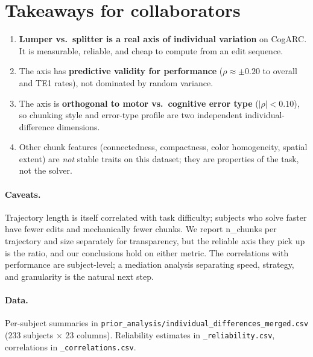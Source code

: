 \documentclass[11pt]{article}
\begin{document}
\section*{Takeaways for collaborators}

\begin{enumerate}
  \item \textbf{Lumper vs.\ splitter is a real axis of individual
    variation} on CogARC. It is measurable, reliable, and cheap to
    compute from an edit sequence.
  \item The axis has \textbf{predictive validity for performance} ($\rho
    \approx \pm 0.20$ to overall and TE1 rates), not dominated by
    random variance.
  \item The axis is \textbf{orthogonal to motor vs.~cognitive error
    type} ($|\rho| < 0.10$), so chunking style and error-type profile
    are two independent individual-difference dimensions.
  \item Other chunk features (connectedness, compactness, color
    homogeneity, spatial extent) are \emph{not} stable traits on this
    dataset; they are properties of the task, not the solver.
\end{enumerate}

\paragraph{Caveats.} Trajectory length is itself correlated with task
difficulty; subjects who solve faster have fewer edits and mechanically
fewer chunks. We report n\_chunks per trajectory and size separately
for transparency, but the reliable axis they pick up is the ratio,
and our conclusions hold on either metric. The correlations
with performance are subject-level; a mediation analysis separating
speed, strategy, and granularity is the natural next step.

\paragraph{Data.} Per-subject summaries in
\texttt{prior\_analysis/individual\_differences\_merged.csv} (233
subjects × 23 columns). Reliability estimates in
\texttt{\_reliability.csv}, correlations in
\texttt{\_correlations.csv}.
\end{document}
